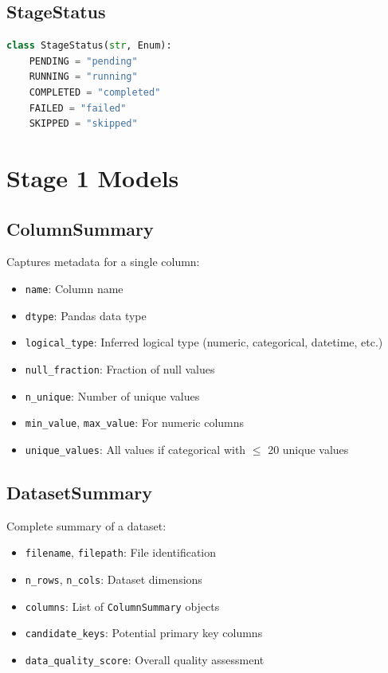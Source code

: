 \documentclass[12pt,a4paper]{report}
\begin{document}
\subsection{StageStatus}
\begin{lstlisting}[language=Python]
class StageStatus(str, Enum):
    PENDING = "pending"
    RUNNING = "running"
    COMPLETED = "completed"
    FAILED = "failed"
    SKIPPED = "skipped"
\end{lstlisting}

\section{Stage 1 Models}
\subsection{ColumnSummary}
Captures metadata for a single column:
\begin{itemize}
    \item \texttt{name}: Column name
    \item \texttt{dtype}: Pandas data type
    \item \texttt{logical\_type}: Inferred logical type (numeric, categorical, datetime, etc.)
    \item \texttt{null\_fraction}: Fraction of null values
    \item \texttt{n\_unique}: Number of unique values
    \item \texttt{min\_value}, \texttt{max\_value}: For numeric columns
    \item \texttt{unique\_values}: All values if categorical with $\leq$ 20 unique values
\end{itemize}

\subsection{DatasetSummary}
Complete summary of a dataset:
\begin{itemize}
    \item \texttt{filename}, \texttt{filepath}: File identification
    \item \texttt{n\_rows}, \texttt{n\_cols}: Dataset dimensions
    \item \texttt{columns}: List of \texttt{ColumnSummary} objects
    \item \texttt{candidate\_keys}: Potential primary key columns
    \item \texttt{data\_quality\_score}: Overall quality assessment
\end{itemize}
\end{document}
